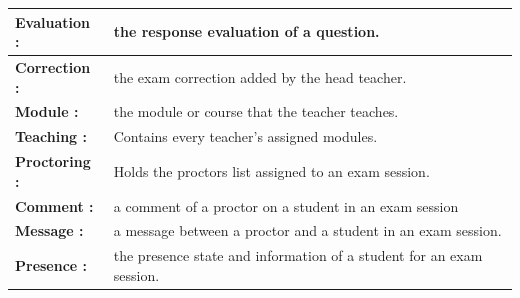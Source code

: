 \documentclass[]{uc2pfecaneva}
\begin{document}
\begin{table}
\begin{tabularx}{\textwidth}{|l|X|}
            \textbf{Evaluation :} & the response evaluation of a question.\\ \hline
            \textbf{Correction :} & the exam correction added by the head teacher.\\ \hline
            \textbf{Module :} & the module or course that the teacher teaches.\\ \hline
            \textbf{Teaching :} & Contains every teacher's assigned modules.\\ \hline
            \textbf{Proctoring :} & Holds the proctors list assigned to an exam session.\\ \hline
            \textbf{Comment :} & a comment of a proctor on a student in an exam session\\ \hline
            \textbf{Message :} & a message between a proctor and a student in an exam session.\\ \hline
            \textbf{Presence :} & the presence state and information of a student for an exam session.\\ \hline
        \end{tabularx}
        \label{table:1}
    \end{table}

    \clearpage
\end{document}
